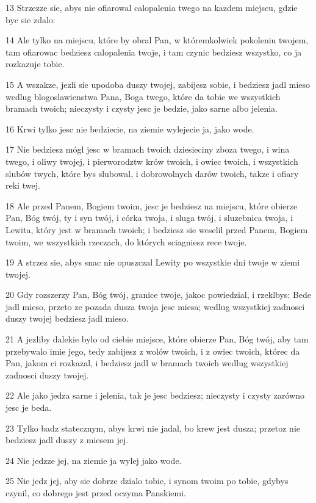 \par 13 Strzezze sie, abys nie ofiarowal calopalenia twego na kazdem miejscu, gdzie byc sie zdalo:
\par 14 Ale tylko na miejscu, które by obral Pan, w któremkolwiek pokoleniu twojem, tam ofiarowac bedziesz calopalenia twoje, i tam czynic bedziesz wszystko, co ja rozkazuje tobie.
\par 15 A wszakze, jezli sie upodoba duszy twojej, zabijesz sobie, i bedziesz jadl mieso wedlug blogoslawienstwa Pana, Boga twego, które da tobie we wszystkich bramach twoich; nieczysty i czysty jesc je bedzie, jako sarne albo jelenia.
\par 16 Krwi tylko jesc nie bedziecie, na ziemie wylejecie ja, jako wode.
\par 17 Nie bedziesz mógl jesc w bramach twoich dziesieciny zboza twego, i wina twego, i oliwy twojej, i pierworodztw krów twoich, i owiec twoich, i wszystkich slubów twych, które bys slubowal, i dobrowolnych darów twoich, takze i ofiary reki twej.
\par 18 Ale przed Panem, Bogiem twoim, jesc je bedziesz na miejscu, które obierze Pan, Bóg twój, ty i syn twój, i córka twoja, i sluga twój, i sluzebnica twoja, i Lewita, który jest w bramach twoich; i bedziesz sie weselil przed Panem, Bogiem twoim, we wszystkich rzeczach, do których sciagniesz rece twoje.
\par 19 A strzez sie, abys snac nie opuszczal Lewity po wszystkie dni twoje w ziemi twojej.
\par 20 Gdy rozszerzy Pan, Bóg twój, granice twoje, jakoc powiedzial, i rzeklbys: Bede jadl mieso, przeto ze pozada dusza twoja jesc miesa; wedlug wszystkiej zadnosci duszy twojej bedziesz jadl mieso.
\par 21 A jezliby dalekie bylo od ciebie miejsce, które obierze Pan, Bóg twój, aby tam przebywalo imie jego, tedy zabijesz z wolów twoich, i z owiec twoich, którec da Pan, jakom ci rozkazal, i bedziesz jadl w bramach twoich wedlug wszystkiej zadnosci duszy twojej.
\par 22 Ale jako jedza sarne i jelenia, tak je jesc bedziesz; nieczysty i czysty zarówno jesc je beda.
\par 23 Tylko badz statecznym, abys krwi nie jadal, bo krew jest dusza; przetoz nie bedziesz jadl duszy z miesem jej.
\par 24 Nie jedzze jej, na ziemie ja wylej jako wode.
\par 25 Nie jedz jej, aby sie dobrze dzialo tobie, i synom twoim po tobie, gdybys czynil, co dobrego jest przed oczyma Panskiemi.
